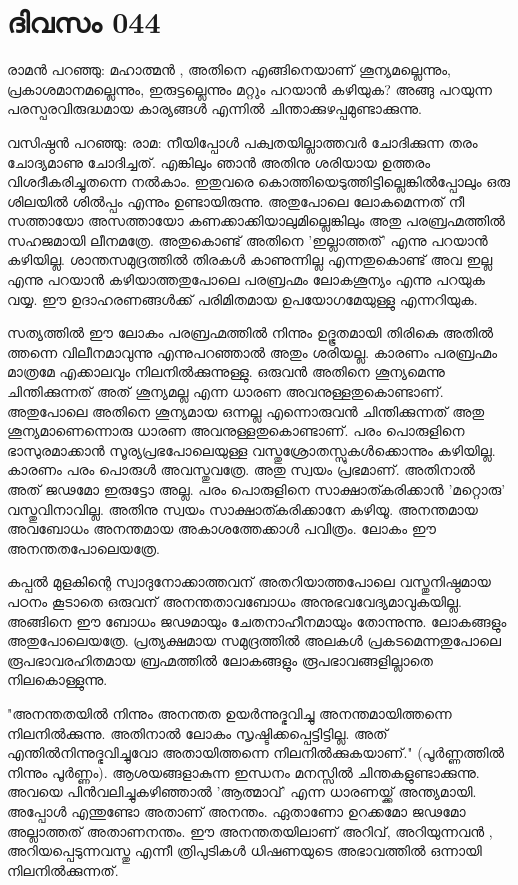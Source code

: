 \newpage
\section{ദിവസം 044}


രാമന്‍ പറഞ്ഞു: മഹാത്മന്‍ , അതിനെ എങ്ങിനെയാണ്‌ ശൂന്യമല്ലെന്നും, പ്രകാശമാനമല്ലെന്നും, ഇരുട്ടല്ലെന്നും മറ്റും പറയാന്‍ കഴിയുക? അങ്ങു പറയുന്ന പരസ്പരവിരുദ്ധമായ കാര്യങ്ങള്‍ എന്നില്‍ ചിന്താക്കുഴപ്പമുണ്ടാക്കുന്നു.

വസിഷ്ഠന്‍ പറഞ്ഞു: രാമ: നീയിപ്പോള്‍ പക്വതയില്ലാത്തവര്‍ ചോദിക്കുന്ന തരം ചോദ്യമാണു ചോദിച്ചത്‌. എങ്കിലും ഞാന്‍ അതിനു ശരിയായ ഉത്തരം വിശദീകരിച്ചുതന്നെ നല്‍കാം. ഇതുവരെ കൊത്തിയെടുത്തിട്ടില്ലെങ്കില്‍പ്പോലും ഒരു ശിലയില്‍ ശില്‍പ്പം എന്നും ഉണ്ടായിരുന്നു. അതുപോലെ ലോകമെന്നത്‌ നീ സത്തായോ അസത്തായോ കണക്കാക്കിയാലുമില്ലെങ്കിലും അതു പരബ്രഹ്മത്തില്‍ സഹജമായി ലീനമത്രേ. അതുകൊണ്ട്‌ അതിനെ 'ഇല്ലാത്തത്‌' എന്നു പറയാന്‍ കഴിയില്ല. ശാന്തസമുദ്രത്തില്‍ തിരകള്‍ കാണുന്നില്ല എന്നതുകൊണ്ട്‌ അവ ഇല്ല എന്നു പറയാന്‍ കഴിയാത്തതുപോലെ പരബ്രഹ്മം ലോകശൂന്യം എന്നു പറയുക വയ്യ. ഈ ഉദാഹരണങ്ങള്‍ക്ക്‌ പരിമിതമായ ഉപയോഗമേയുള്ളു എന്നറിയുക. 

സത്യത്തില്‍ ഈ ലോകം പരബ്രഹ്മത്തില്‍ നിന്നും ഉദ്ഭൂതമായി തിരികെ അതില്‍ ത്തന്നെ വിലീനമാവുന്നു എന്നുപറഞ്ഞാല്‍ അതും ശരിയല്ല. കാരണം പരബ്രഹ്മം മാത്രമേ എക്കാലവും നിലനില്‍ക്കുന്നുള്ളു. ഒരുവന്‍ അതിനെ ശൂന്യമെന്നു ചിന്തിക്കുന്നത്‌ അത്‌ ശൂന്യമല്ല എന്ന ധാരണ അവനുള്ളതുകൊണ്ടാണ്‌. അതുപോലെ അതിനെ ശൂന്യമായ ഒന്നല്ല എന്നൊരുവന്‍ ചിന്തിക്കുന്നത്‌ അതു ശൂന്യമാണെന്നൊരു ധാരണ അവനുള്ളതുകൊണ്ടാണ്‌. പരം പൊരുളിനെ ഭാസുരമാക്കാന്‍ സൂര്യപ്രഭപോലെയുള്ള വസ്തുശ്രോതസ്സുകള്‍ക്കൊന്നും കഴിയില്ല. കാരണം പരം പൊരുള്‍ അവസ്തുവത്രേ. അതു സ്വയം പ്രഭമാണ്‌. അതിനാല്‍ അത്‌ ജഢമോ ഇരുട്ടോ അല്ല. പരം പൊരുളിനെ സാക്ഷാത്കരിക്കാന്‍ 'മറ്റൊരു' വസ്തുവിനാവില്ല. അതിനു സ്വയം സാക്ഷാത്കരിക്കാനേ കഴിയൂ. അനന്തമായ അവബോധം അനന്തമായ അകാശത്തേക്കാള്‍ പവിത്രം. ലോകം ഈ അനന്തതപോലെയത്രേ. 

കപ്പല്‍ മുളകിന്റെ സ്വാദുനോക്കാത്തവന്‌ അതറിയാത്തപോലെ വസ്തുനിഷ്ഠമായ പഠനം കൂടാതെ ഒരുവന്‌ അനന്തതാവബോധം അനുഭവവേദ്യമാവുകയില്ല. അങ്ങിനെ ഈ ബോധം ജഢമായും ചേതനാഹീനമായും തോന്നുന്നു. ലോകങ്ങളും അതുപോലെയത്രേ. പ്രത്യക്ഷമായ സമുദ്രത്തില്‍ അലകള്‍ പ്രകടമെന്നതുപോലെ രൂപഭാവരഹിതമായ ബ്രഹ്മത്തില്‍ ലോകങ്ങളും രൂപഭാവങ്ങളില്ലാതെ നിലകൊള്ളുന്നു.

"അനന്തതയില്‍ നിന്നും അനന്തത ഉയര്‍ന്നുദ്ഭവിച്ചു അനന്തമായിത്തന്നെ നിലനില്‍ക്കുന്നു. അതിനാല്‍ ലോകം സൃഷ്ടിക്കപ്പെട്ടിട്ടില്ല. അത്‌ എന്തില്‍നിന്നുദ്ഭവിച്ചുവോ അതായിത്തന്നെ നിലനില്‍ക്കുകയാണ്‌." (പൂര്‍ണ്ണത്തില്‍ നിന്നും പൂര്‍ണ്ണം). ആശയങ്ങളാകുന്ന ഇന്ധനം മനസ്സില്‍ ചിന്തകളുണ്ടാക്കുന്നു. അവയെ പിന്‍വലിച്ചുകഴിഞ്ഞാല്‍ 'ആത്മാവ്‌' എന്ന ധാരണയ്ക്ക്‌ അന്ത്യമായി. അപ്പോള്‍ എന്തുണ്ടോ അതാണ്‌ അനന്തം. ഏതാണോ ഉറക്കമോ ജഢമോ അല്ലാത്തത്‌ അതാണനന്തം. ഈ അനന്തതയിലാണ്‌ അറിവ്‌, അറിയുന്നവന്‍ , അറിയപ്പെടുന്നവസ്തു എന്നീ ത്രിപുടികള്‍ ധിഷണയുടെ അഭാവത്തില്‍ ഒന്നായി നിലനില്‍ക്കുന്നത്‌.
